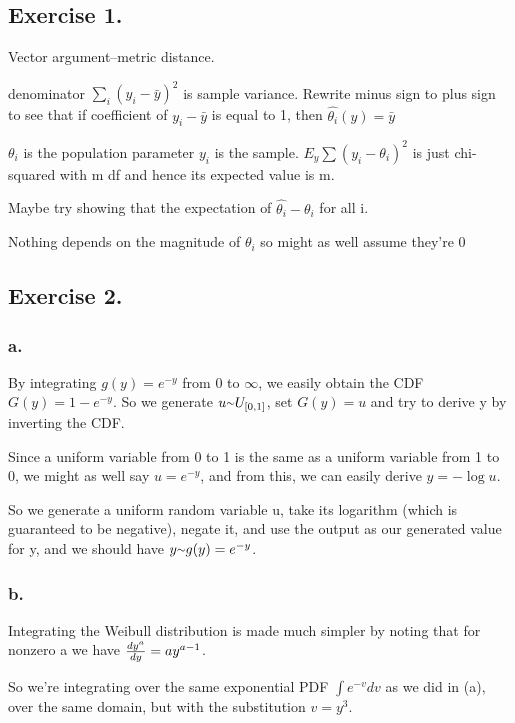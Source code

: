 \documentclass{article}
\newcommand{\mytilde}{\raise.17ex\hbox{$\scriptstyle\mathtt{\sim}$}}
\begin{document}
\subsection{Exercise 1.}

Vector argument--metric distance.

denominator \(\sum_i (y_i - \bar{y})^2\) is sample variance. Rewrite minus sign to plus
sign to see that if coefficient of \(y_i - \bar{y}\) is equal to 1, then \(\hat{\theta_i}(y) = \bar{y}\)

\(\theta_i\) is the population parameter \(y_i\) is the sample. \(E_y\sum (y_i - \theta_i)^2\) is just
chi-squared with m df and hence its expected value is m.

Maybe try showing that the expectation of \(\hat{\theta_i} - \theta_i\) for all i.

Nothing depends on the magnitude of \(\theta_i\) so might as well assume they're 0


\subsection{Exercise 2.}

\subsubsection{a.}

By integrating \(g(y) = e^{-y}\) from 0 to \(\infty\), we easily obtain the CDF \(G(y) = 1 - e^{-y}\).
So we generate \(u \mytilde U_{[0,1]}\), set \(G(y) = u\) and try to derive y by inverting the CDF. 

Since a uniform variable from 0 to 1 is the same as a uniform variable from 1 to 0, we might as well
say \(u = e^{-y}\), and from this, we can easily derive \(y = -\log{u}\). 

So we generate a uniform random variable u,
take its logarithm (which is guaranteed to be negative), negate it, and use the output as our generated 
value for y, and we should have \(y \mytilde g(y) = e^{-y}\). 

\subsubsection{b.}

Integrating the Weibull distribution is made much simpler by noting that for nonzero a we have \({dy^a \over dy} = ay^{a - 1}\).

So we're integrating over the same exponential PDF \(\int e^{-v}dv\) as we did in (a), over the same domain,
but with the substitution \(v = y^3\).
\end{document}
